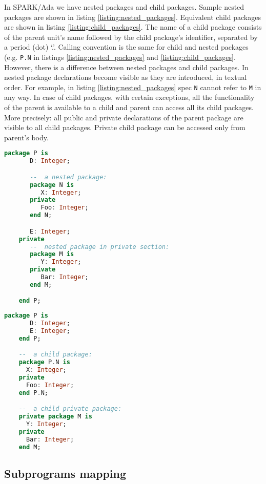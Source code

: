 In SPARK/Ada we have nested packages and child packages. Sample nested packages are shown in listing \ref{listing:nested_packages}. Equivalent child packages are shown in listing \ref{listing:child_packages}. The name of a child package consists of the parent unit's name followed by the child package's identifier, separated by a period (dot) `.'. Calling convention is the same for child and nested packages (e.g. \lstinline{P.N} in listings \ref{listing:nested_packages} and \ref{listing:child_packages}. However, there is a difference between nested packages and child packages. In nested package declarations become visible as they are introduced, in textual order. For example, in listing \ref{listing:nested_packages} spec \lstinline{N} cannot refer to \lstinline{M} in any way. In case of child packages, with certain exceptions, all the functionality of the parent is available to a child and parent can access all its child packages. More precisely: all public and private declarations of the parent package are visible to all child packages. Private child package can be accessed only from parent's body.

\begin{lstlisting}[language=ada, frame=single, gobble=0, caption={Nested packages in SPARK/Ada}, label={listing:nested_packages}]
	package P is
	   D: Integer;

	   --  a nested package:
	   package N is
	      X: Integer;
	   private
	      Foo: Integer;
	   end N;

	   E: Integer;
	private
	   --  nested package in private section:
	   package M is
	      Y: Integer;
	   private
	      Bar: Integer;
	   end M;

	end P;
\end{lstlisting}

\begin{lstlisting}[language=ada, frame=single, gobble=0, caption={Child packages in SPARK/Ada}, label={listing:child_packages}]
	package P is
	   D: Integer;
	   E: Integer;
	end P;

	--  a child package:
	package P.N is
      X: Integer;
   	private
      Foo: Integer;
	end P.N;

	--  a child private package:
	private package M is
	  Y: Integer;
	private
	  Bar: Integer;
	end M;
\end{lstlisting}

\subsection{Subprograms mapping}
\label{codegen:mapping:subprograms}

